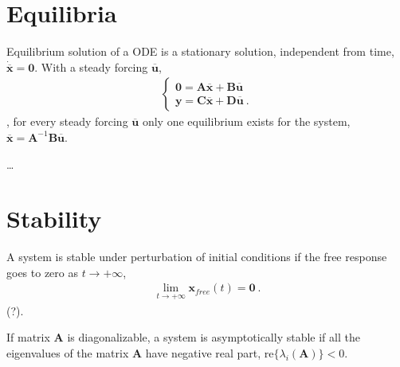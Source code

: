 \documentclass[letterpaper,10pt,english]{jupyterBook}
\begin{document}
\section{Equilibria}
\label{\detokenize{ch/system-theory/lti-response:equilibria}}\label{\detokenize{ch/system-theory/lti-response:ode-lti-response-equilibria}}
\sphinxAtStartPar
Equilibrium solution of a ODE is a stationary solution, independent from time, \(\dot{\overline{\mathbf{x}}} = \mathbf{0}\). With a steady forcing \(\overline{\mathbf{u}}\),
\begin{equation*}
\begin{split}\begin{cases}
  \mathbf{0} = \mathbf{A} \overline{\mathbf{x}} + \mathbf{B} \overline{\mathbf{u}} \\
  \mathbf{y} = \mathbf{C} \overline{\mathbf{x}} + \mathbf{D} \overline{\mathbf{u}} \ .
\end{cases}\end{split}
\end{equation*}
\sphinxAtStartPar
{}, for every steady forcing \(\overline{\mathbf{u}}\) only one equilibrium exists for the system, \(\overline{\mathbf{x}} = \mathbf{A}^{-1} \mathbf{B} \overline{\mathbf{u}}\).

\sphinxAtStartPar
{}… 


\section{Stability}
\label{\detokenize{ch/system-theory/lti-response:stability}}\label{\detokenize{ch/system-theory/lti-response:ode-lti-response-stability}}
\sphinxAtStartPar
{} A system is stable under perturbation of initial conditions if the free response goes to zero as \(t \rightarrow + \infty\),
\begin{equation*}
\begin{split}\lim_{t \rightarrow +\infty} \mathbf{x}_{free}(t) = \mathbf{0} \ .\end{split}
\end{equation*}
\sphinxAtStartPar
{} (?).

\sphinxAtStartPar
If matrix \(\mathbf{A}\) is diagonalizable, a system is asymptotically stable if all the eigenvalues of the matrix \(\mathbf{A}\) have negative real part, \(\text{re}\{\lambda_i(\mathbf{A})\} < 0\).
\end{document}
